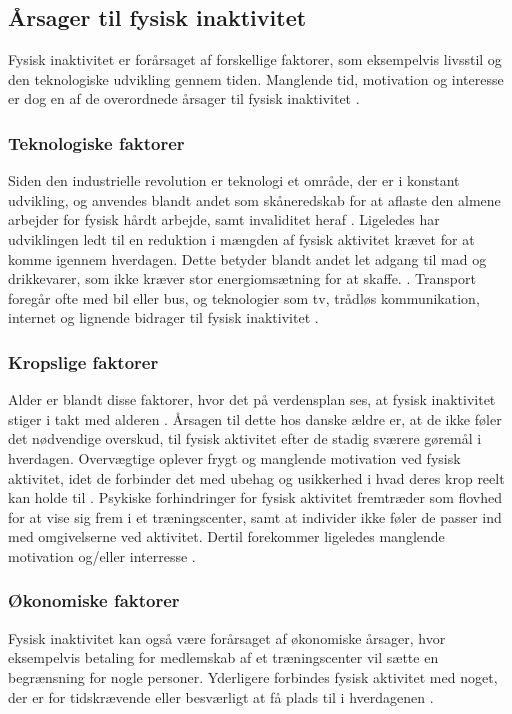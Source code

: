 \subsection{Årsager til fysisk inaktivitet}
Fysisk inaktivitet er forårsaget af forskellige faktorer, som eksempelvis livsstil og den teknologiske udvikling gennem tiden. Manglende tid, motivation og interesse er dog en af de overordnede årsager til fysisk inaktivitet \citep{ottesen2005}.  

\subsubsection{Teknologiske faktorer}  
Siden den industrielle revolution er teknologi et område, der er i konstant udvikling, og anvendes blandt andet som skåneredskab for at aflaste den almene arbejder for fysisk hårdt arbejde, samt invaliditet heraf \citep{hallal2012}. 
Ligeledes har udviklingen ledt til en reduktion i mængden af fysisk aktivitet krævet for at komme igennem hverdagen. Dette betyder blandt andet let adgang til mad og drikkevarer, som ikke kræver stor energiomsætning for at skaffe. \citep{hallal2012, motionsraad2007}.  Transport foregår ofte med bil eller bus, og teknologier som tv, trådløs kommunikation, internet og lignende bidrager til fysisk inaktivitet \citep{hallal2012}.  

\subsubsection{Kropslige faktorer}
Alder er blandt disse faktorer, hvor det på verdensplan ses, at fysisk inaktivitet stiger i takt med alderen \citep{guthold2008}. 
Årsagen til dette hos danske ældre er, at de ikke føler det nødvendige overskud, til fysisk aktivitet efter de stadig sværere gøremål i hverdagen. 
Overvægtige oplever frygt og manglende motivation ved fysisk aktivitet, idet de forbinder det med ubehag og usikkerhed i hvad deres krop reelt kan holde til \citep{ottesen2005}. 
Psykiske forhindringer for fysisk aktivitet fremtræder som flovhed for at vise sig frem i et træningscenter, samt at individer ikke føler de passer ind med omgivelserne ved aktivitet. 
Dertil forekommer ligeledes manglende motivation og/eller interresse \citep{ottesen2005}.

\subsubsection{Økonomiske faktorer}
Fysisk inaktivitet kan også være forårsaget af økonomiske årsager, hvor eksempelvis betaling for medlemskab af et træningscenter vil sætte en begrænsning for nogle personer. Yderligere forbindes fysisk aktivitet med noget, der er for tidskrævende eller besværligt at få plads til i hverdagenen \citep{ottesen2005}.